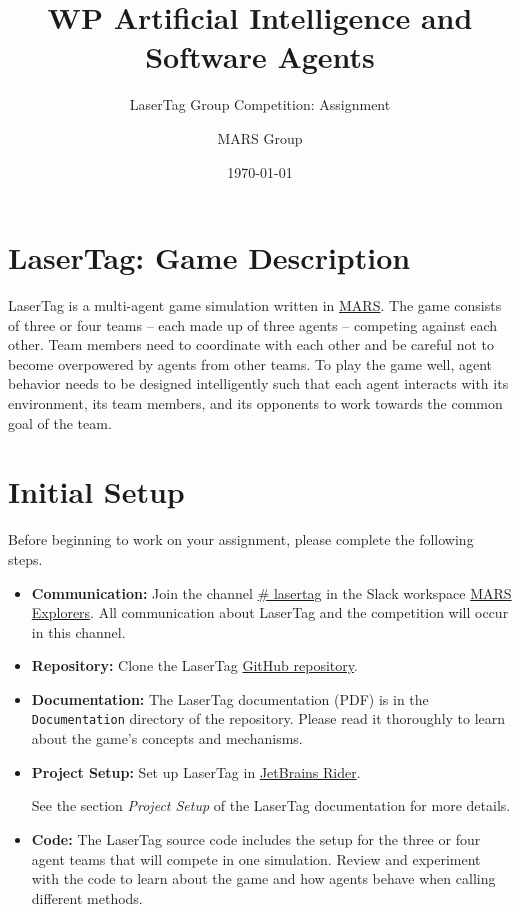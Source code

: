 \documentclass[
    a4paper,
    english,
    DIV=16,
    11pt,
    parskip=half,
]{scrartcl}
\title{WP Artificial Intelligence and Software Agents}
\subtitle{LaserTag Group Competition: Assignment}
\author{MARS Group}
\date{\today}
\begin{document}
\maketitle
\section*{LaserTag: Game Description}
LaserTag is a multi-agent game simulation written in \href{https://mars-group-haw.github.io/index.html}{MARS}. The game consists of three or four teams -- each made up of three agents -- competing against each other. Team members need to coordinate with each other and be careful not to become overpowered by agents from other teams. To play the game well, agent behavior needs to be designed intelligently such that each agent interacts with its environment, its team members, and its opponents to work towards the common goal of the team.

\section*{Initial Setup}

Before beginning to work on your assignment, please complete the following steps.

\begin{itemize}
  \item \textbf{Communication:} Join the channel \underline{\# lasertag} in the Slack workspace \href{https://join.slack.com/t/mars-explorers/shared_invite/zt-recgxwyo-WWOpjkLFq69CxQtSrlBIxw}{MARS Explorers}. All communication about LaserTag and the competition will occur in this channel.
  \item \textbf{Repository:} Clone the LaserTag \href{https://github.com/MARS-Group-HAW/model-mars-laser-tag-game}{GitHub repository}.
  \item \textbf{Documentation:} The LaserTag documentation (PDF) is in the \texttt{Documentation} directory of the repository. Please read it thoroughly to learn about the game's concepts and mechanisms.
  \item \textbf{Project Setup:} Set up LaserTag in \href{https://www.jetbrains.com/rider/}{JetBrains Rider}.
  
  \faLightbulbO\: See the section \emph{Project Setup} of the LaserTag documentation for more details.
  \item \textbf{Code:} The LaserTag source code includes the setup for the three or four agent teams that will compete in one simulation. Review and experiment with the code to learn about the game and how agents behave when calling different methods.
\end{itemize}
\end{document}
